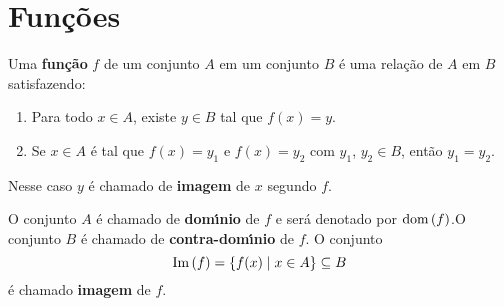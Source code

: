 \chapter{Fun{\c c}{\~o}es}

\begin{definicao}
Uma \textbf{fun{\c c}{\~a}o} $f$ de um conjunto $A$ em um conjunto $B$ {\'e} uma rela{\c c}{\~a}o de $A$ em $B$ satisfazendo:
	\begin{enumerate}
		\item Para todo $x \in A$, existe $y \in B$ tal que $f(x) = y$.
		\item  Se $x \in A$ é tal que $f(x) = y_{1}$ e $f(x) = y_{2}$ com $y_1$, $y_2 \in B$, então $y_{1} = y_{2}$.
	\end{enumerate}
Nesse caso $y$ é chamado de \textbf{imagem} de $x$ segundo $f$.
\end{definicao}

O conjunto $A$ {\'e} chamado de \textbf{dom{\'\i}nio} de $f$ e será denotado por ${\rm dom\,}(f)$.O conjunto $B$ {\'e} chamado de \textbf{contra-dom{\'\i}nio} de $f$. O conjunto
\[
	{\rm Im\,}(f) = \{f(x) \mid x \in A\} \subseteq B
\]
é chamado \textbf{imagem} de $f$.

